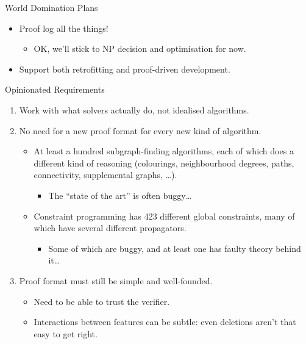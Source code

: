 \documentclass{beamer}
\begin{document}
\begin{frame}{World Domination Plans}
    \begin{itemize}
        \item Proof log all the things!
            \begin{itemize}
                \item OK, we'll stick to NP decision and optimisation for now.
            \end{itemize}
        \item Support both retrofitting and proof-driven development.
    \end{itemize}
\end{frame}

\begin{frame}{Opinionated Requirements}
    \begin{enumerate}
        \item Work with what solvers actually do, not idealised algorithms.
        \item No need for a new proof format for every new kind of algorithm.
            \begin{itemize}
                \item At least a hundred subgraph-finding algorithms, each of which does a different
                    kind of reasoning (colourings, neighbourhood degrees, paths, connectivity,
                    supplemental graphs, \ldots).
                    \begin{itemize}
                        \item The ``state of the art'' is often buggy\ldots
                    \end{itemize}
                \item Constraint programming has 423 different global constraints, many of which
                    have several different propagators.
                    \begin{itemize}
                        \item Some of which are buggy, and at least one has faulty theory behind it\ldots
                    \end{itemize}
            \end{itemize}
        \item Proof format must still be simple and well-founded.
            \begin{itemize}
                \item Need to be able to trust the verifier.
                \item Interactions between features can be subtle: even deletions aren't that easy
                    to get right.
            \end{itemize}
    \end{enumerate}
\end{frame}
\end{document}
